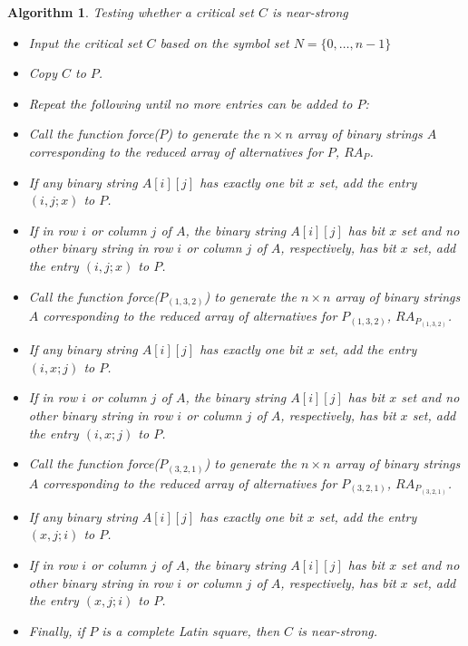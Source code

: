 \documentclass[12pt]{report}
\newtheorem{algorithm}{Algorithm}
\begin{document}
\begin{algorithm}{Testing whether a critical set $C$ is near-strong}
\begin{itemize}
\item Input the critical set $C$ based on the symbol set $N=\{0,\dots,n-1\}$
\item Copy $C$ to $P$.
\item Repeat the following until no more entries can be added to $P$:
\item[-] Call the function force($P$) to generate the $n \times n$ array of binary strings $A$ corresponding to the reduced array of alternatives for $P$, $RA_P$.
\item[-] If any binary string $A[i][j]$ has exactly one bit $x$ set, add the entry $(i,j;x)$ to $P$.
\item[-] If in row $i$ or column $j$ of $A$, the binary string $A[i][j]$ has bit $x$ set and no other binary string in row $i$ or column $j$ of $A$, respectively, has bit $x$ set, add the entry $(i,j;x)$ to $P$.
\item[-] Call the function force($P_{(1,3,2)}$) to generate the $n \times n$ array of binary strings $A$ corresponding to the reduced array of alternatives for $P_{(1,3,2)}$, $RA_{P_{(1,3,2)}}$.
\item[-] If any binary string $A[i][j]$ has exactly one bit $x$ set, add the entry $(i,x;j)$ to $P$.
\item[-] If in row $i$ or column $j$ of $A$, the binary string $A[i][j]$ has bit $x$ set and no other binary string in row $i$ or column $j$ of $A$, respectively, has bit $x$ set, add the entry $(i,x;j)$ to $P$.
\item[-] Call the function force($P_{(3,2,1)}$) to generate the $n \times n$ array of binary strings $A$ corresponding to the reduced array of alternatives for $P_{(3,2,1)}$, $RA_{P_{(3,2,1)}}$.
\item[-] If any binary string $A[i][j]$ has exactly one bit $x$ set, add the entry $(x,j;i)$ to $P$.
\item[-] If in row $i$ or column $j$ of $A$, the binary string $A[i][j]$ has bit $x$ set and no other binary string in row $i$ or column $j$ of $A$, respectively, has bit $x$ set, add the entry $(x,j;i)$ to $P$.
\item Finally, if $P$ is a complete Latin square, then $C$ is near-strong.
\end{itemize}


\end{algorithm}
\end{document}
